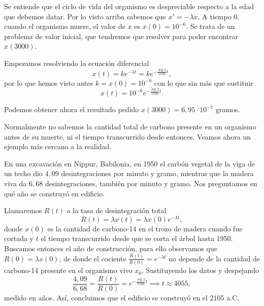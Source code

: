 \documentclass[../ecuaciones_diferenciales.tex]{subfiles}
\begin{document}
\begin{solution}
	Se entiende que el ciclo de vida del organismo es despreciable respecto a la
	edad que debemos datar. Por lo visto arriba sabemos que \(x' = -\lambda x\).
	A tiempo \(0\), cuando el organismo muere, el valor de \(x\) es
	\(x(0) = 10^{-6}\). Se trata de un problema de valor inicial, que tendremos
	que resolver para poder encontrar \(x(3000)\). 

	Empezamos resolviendo la ecuación diferencial
	\[x(t) = k e^{-\lambda t} = k e^{-\frac{\log 2}{5730} t},\]
	por lo que hemos visto antes \(k = x(0) = 10^{-6}\) con lo que sin más que
	sustituir
	\[x(t) = 10^{-6} e^{-\frac{\log 2}{5730} t}.\]

	Podemos obtener ahora el resultado pedido 
	\(x(3000) = 6,95 \cdot 10^{-7}\) gramos.
\end{solution}

Normalmente no sabemos la cantidad total de carbono presente en un organismo
antes de su muerte, ni el tiempo transcurrido desde entonces. Veamos ahora un
ejemplo más cercano a la realidad.

\begin{example}
	En una excavación en Nippur, Babilonia, en 1950 el carbón vegetal de la viga
	de un techo dio \(4,09\) desintegraciones por minuto y gramo, mientras que
	la madera viva da \(6,68\) desintegraciones, también por minuto y gramo.
	Nos preguntamos en qué año se construyó en edificio.
\end{example}

\begin{solution}
	Llamaremos \(R(t)\) a la tasa de desintegración total
	\[R(t) = \lambda x(t) = \lambda x(0) e^{-\lambda t},\]
	donde \(x(0)\) es la
	cantidad de carbono-14 en el trozo de madera cuando fue cortada y \(t\) el
	tiempo transcurrido desde que se corta el árbol hasta 1950. Buscamos entonces
	el año de construcción, para ello observamos que \(R(0) = \lambda x(0)\), de
	donde el cociente \(\frac{R(t)}{R(0)} = e^{-\lambda t}\) no depende de la
	cantidad de carbono-14 presente en el organismo vivo \(x_0\). Sustituyendo
	los datos y despejando
	\[\frac{4,09}{6,68} = \frac{R(t)}{R(0)} = e^{-\frac{\log 2}{5730} t}
		\implies t \approx 4055,\]
	medido en años. Así, concluimos que el edificio se construyó en el \(2105\)
	a.C.
\end{solution}
\end{document}

